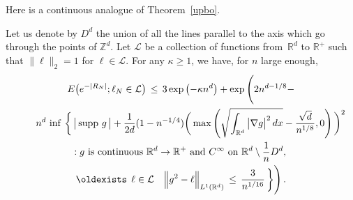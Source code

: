 \documentclass[AHL, Unicode, longabstracts, published]{cedram}
\newcommand*\supp{\text{supp\,}}
\newcommand*\Zd {{\mathbb Z^d}}
\newcommand*\Rd {{\mathbb R^d}}
\newcommand*\R{\mathbb{R}}
\newcommand{\cL}{\mathcal{L}}
\renewcommand*{\exists}{\mathrel{\oldexists}}
\begin{document}
Here is a continuous analogue of Theorem~\ref{upbo}.
\begin{theo}\label{cupbo}
Let us denote by $D^d$ the union of all the lines parallel to the axis which go through the points of $\Zd$. Let $\cL$ be a collection of functions from~$\Rd$ to $\R^+$ such that $\big\| \ell\big\|_2=1$ for $\ell\in\cL$. For any $\kappa\geq 1$, we have, for $n$ large enough,
\begin{multline*}
E\big(e^{-|R_N|};
\ell_N\in\cL\big)\,\leq\, 3\exp\left(-\kappa n^d\right)+
\exp\Bigg(2n^{d-1/8}-
\\
\qquad n^d\,\inf\,\bigg\{\,
\big|\,\supp\,g\,\big| +
\frac{1} {2d} (1-n^{-1/4})
\bigg(\max\left(
\sqrt{
\int_{\Rd}\big|\nabla g\big|^2\,dx }-
\frac{\sqrt{d}}{n^{1/8}},0\right) \bigg)^2
\hfill\\
\hfill :g\text{ is continuous } \Rd\to\R^+
\text{ and }C^\infty\text{ on }\Rd\setminus \frac{1}{n}D^d,\,
\hfill\\
\exists\,\ell\in\cL\quad
\Big\|g^2- \ell\Big\|_{L^1(\Rd)}
\,\leq\,
\frac{3}{n^{1/16}}
\,\bigg\}\Bigg)\,.
\end{multline*}
\end{theo}
\end{document}
